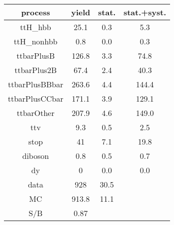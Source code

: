 \begin{tabular}{cccc}
\hline
    process     &  yield  &  stat.  &  stat.+syst.  \\
\hline
    ttH\_hbb     &  25.1   &   0.3   &      5.3      \\
   ttH\_nonhbb   &   0.8   &   0.0   &      0.3      \\
   ttbarPlusB   &  126.8  &   3.3   &     74.8      \\
  ttbarPlus2B   &  67.4   &   2.4   &     40.3      \\
 ttbarPlusBBbar &  263.6  &   4.4   &     144.4     \\
 ttbarPlusCCbar &  171.1  &   3.9   &     129.1     \\
   ttbarOther   &  207.9  &   4.6   &     149.0     \\
      ttv       &   9.3   &   0.5   &      2.5      \\
      stop      &   41    &   7.1   &     19.8      \\
    diboson     &   0.8   &   0.5   &      0.7      \\
       dy       &    0    &   0.0   &      0.0      \\
      data      &   928   &  30.5   &               \\
       MC       &  913.8  &  11.1   &               \\
      S/B       &  0.87   &         &               \\
\hline
\end{tabular}